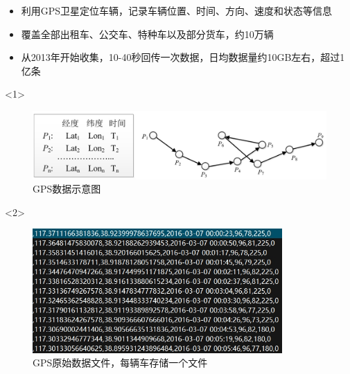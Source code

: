 \documentclass{beamerthemeMono}
\begin{document}
\begin{frame}[t]{\subsecname}
\begin{itemize}
\item<1-> 利用GPS卫星定位车辆，记录车辆位置、时间、方向、速度和状态等信息
\item<1-> 覆盖全部出租车、公交车、特种车以及部分货车，约10万辆
\item<2-> 从2013年开始收集，10-40秒回传一次数据，日均数据量约10GB左右，超过1亿条 
\end{itemize}

\begin{overlayarea}{\textwidth}{\textheight}
  \begin{onlyenv}<1>
\begin{figure}
  \centering
  \includegraphics[width=\textwidth]{chp02_GPS示意图.jpg}
  \caption{GPS数据示意图}
\end{figure}
  \end{onlyenv}

\vspace{-10pt}
  \begin{onlyenv}<2>
\begin{figure}
  \centering
  \includegraphics[width=0.85\textwidth]{chp02_GPS原始数据.jpg}
  \caption{GPS原始数据文件，每辆车存储一个文件}
\end{figure}
  \end{onlyenv}


\end{overlayarea}
\end{frame}
\end{document}
